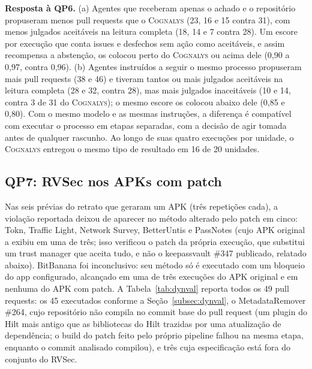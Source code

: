 \documentclass[conference]{IEEEtran}
\newcommand{\system}{\textsc{Cognalys}}
\newcommand{\researchq}[1]{\textbf{QP#1}}
\begin{document}
\textbf{Resposta à \researchq{6}.} (a) Agentes que receberam apenas o achado e o
repositório propuseram menos pull requests que o \system{} (23, 16 e 15 contra 31),
com menos julgados aceitáveis na leitura completa (18, 14 e 7 contra 28). Um escore
por execução que conta issues e desfechos sem ação como aceitáveis, e assim recompensa
a abstenção, os colocou perto do \system{} ou acima dele (0,90 a 0,97, contra
0,96). (b) Agentes instruídos a seguir o mesmo processo propuseram mais pull
requests (38 e 46) e tiveram tantos ou mais julgados aceitáveis na leitura completa
(28 e 32, contra 28), mas mais julgados inaceitáveis (10 e 14, contra 3 de 31 do
\system{}); o mesmo escore os colocou abaixo dele (0,85 e 0,80). Com o mesmo modelo
e as mesmas instruções, a diferença é compatível com executar o processo em
etapas separadas, com a decisão de agir tomada antes de qualquer rascunho. Ao
longo de suas quatro execuções por unidade, o \system{} entregou o mesmo tipo de
resultado em 16 de 20 unidades.

\subsection{\researchq{7}: RVSec nos APKs com patch}
\label{subsec:rq7}

Nas seis prévias do retrato que geraram um APK (três repetições cada), a violação
reportada deixou de aparecer no método alterado pelo patch em cinco: Tokn, Traffic Light,
Network Survey, BetterUntis e PassNotes (cujo APK original a exibiu em uma de
três; isso verificou o patch da própria execução, que substitui um trust manager
que aceita tudo, e não o keepassvault \#347 publicado, relatado abaixo). BitBanana foi inconclusivo: seu método só é executado com um bloqueio do app
configurado, alcançado em uma de três execuções do APK original e em nenhuma do APK com patch.
A Tabela~\ref{tab:dynval} reporta todos os 49 pull requests: os 45 executados conforme a
Seção~\ref{subsec:dynval}, o MetadataRemover \#264, cujo repositório não
compila no commit base do pull request (um plugin do Hilt mais antigo que as
bibliotecas do Hilt trazidas por uma atualização de dependência; o build do
patch feito pelo próprio pipeline falhou na mesma etapa, enquanto o commit analisado compilou), e três cuja especificação está fora do conjunto
do RVSec.
\end{document}

